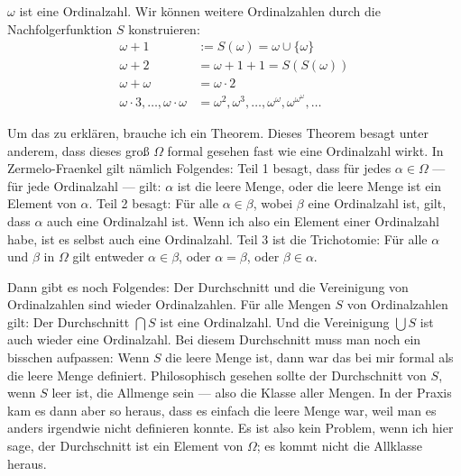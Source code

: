 \begin{ai-global-state-checkpoint-invisible-content}
\end{ai-global-state-checkpoint-invisible-content}

\begin{math-stroke}
\begin{remark}
$\omega$ ist eine Ordinalzahl. Wir können weitere Ordinalzahlen durch die Nachfolgerfunktion $S$ konstruieren:
\begin{align*}
\omega + 1 &:= S(\omega) = \omega \cup \{\omega\} \\
\omega + 2 &= \omega + 1 + 1 = S(S(\omega)) \\
\omega + \omega &= \omega \cdot 2 \\
\omega \cdot 3, \dots, \omega \cdot \omega &= \omega^2, \omega^3, \dots, \omega^\omega, \omega^{\omega^\omega}, \dots
\end{align*}
\end{remark}
\end{math-stroke}

\begin{spoken-clean}[00:36:15 - 00:37:50]
Um das zu erklären, brauche ich ein Theorem. Dieses Theorem besagt unter anderem, dass dieses groß $\Omega$ formal gesehen fast wie eine Ordinalzahl wirkt. In Zermelo-Fraenkel gilt nämlich Folgendes: Teil 1 besagt, dass für jedes $\alpha \in \Omega$ --- für jede Ordinalzahl --- gilt: $\alpha$ ist die leere Menge, oder die leere Menge ist ein Element von $\alpha$. Teil 2 besagt: Für alle $\alpha \in \beta$, wobei $\beta$ eine Ordinalzahl ist, gilt, dass $\alpha$ auch eine Ordinalzahl ist. Wenn ich also ein Element einer Ordinalzahl habe, ist es selbst auch eine Ordinalzahl. Teil 3 ist die Trichotomie: Für alle $\alpha$ und $\beta$ in $\Omega$ gilt entweder $\alpha \in \beta$, oder $\alpha = \beta$, oder $\beta \in \alpha$.

Dann gibt es noch Folgendes: Der Durchschnitt und die Vereinigung von Ordinalzahlen sind wieder Ordinalzahlen. Für alle Mengen $S$ von Ordinalzahlen gilt: Der Durchschnitt $\bigcap S$ ist eine Ordinalzahl. Und die Vereinigung $\bigcup S$ ist auch wieder eine Ordinalzahl. Bei diesem Durchschnitt muss man noch ein bisschen aufpassen: Wenn $S$ die leere Menge ist, dann war das bei mir formal als die leere Menge definiert. Philosophisch gesehen sollte der Durchschnitt von $S$, wenn $S$ leer ist, die Allmenge sein --- also die Klasse aller Mengen. In der Praxis kam es dann aber so heraus, dass es einfach die leere Menge war, weil man es anders irgendwie nicht definieren konnte. Es ist also kein Problem, wenn ich hier sage, der Durchschnitt ist ein Element von $\Omega$; es kommt nicht die Allklasse heraus.
\end{spoken-clean}

